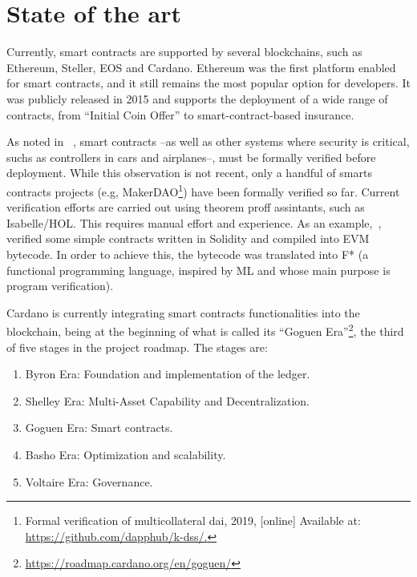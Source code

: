 \documentclass[12pt]{book}
\begin{document}

\section{State of the art}
Currently, smart contracts are supported by several blockchains, such as Ethereum, Steller, EOS and Cardano. Ethereum was the first platform enabled for smart contracts, and it still remains the most popular option for developers. It was publicly released in 2015 and supports the deployment of a wide range of contracts, from ``Initial Coin Offer'' to smart-contract-based insurance.

As noted in ~\cite{9152791}, smart contracts --as well as other systems where security is critical, suchs as controllers in cars and airplanes--, must be formally verified before deployment. While this observation is not recent, only a handful of smarts contracts projects (e.g, MakerDAO\footnote{Formal verification of multicollateral dai, 2019, [online] Available at: \href{https://github.com/dapphub/k-dss/}{https://github.com/dapphub/k-dss/.}}) have been formally verified so far. Current verification efforts are carried out using theorem proff assintants, such as Isabelle/HOL. This requires manual effort and experience. As an example,~\cite{bhargavan:hal-01400469}, verified some simple contracts written in Solidity and compiled into EVM bytecode. In order to achieve this, the bytecode was translated into F* (a functional programming language, inspired by ML and whose main purpose is program verification).

Cardano is currently integrating smart contracts functionalities into the blockchain, being at the beginning of what is called its ``Goguen Era''\footnote{\href{https://roadmap.cardano.org/en/goguen/}{https://roadmap.cardano.org/en/goguen/}}, the third of five stages in the project roadmap. The stages are:

\begin{enumerate}
    \item Byron Era: Foundation and implementation of the ledger.
    \item Shelley Era: Multi-Asset Capability and Decentralization.
    \item Goguen Era: Smart contracts.
    \item Basho Era: Optimization and scalability.
    \item Voltaire Era: Governance. 
\end{enumerate}
\end{document}
